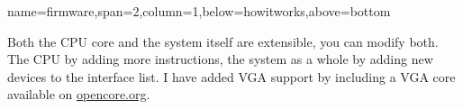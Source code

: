 \documentclass[a1paper,portrait]{baposter}
\begin{document}
\begin{poster}
{name=firmware,span=2,column=1,below=howitworks,above=bottom}{
\smaller

Both the CPU core and the system itself are extensible, you can modify both. The CPU by adding
more instructions, the system as a whole by adding new devices to the interface list. I have
added VGA support by including a VGA core available on \url{opencore.org}.

}

\end{poster}
\end{document}
